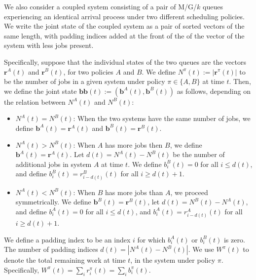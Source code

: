 \documentclass[acmsmall]{acmart}
\newcommand{\rb}{\boldsymbol{r}}
\newcommand{\bb}{\boldsymbol{b}}
\newcommand{\bbb}{\bb\bb}
\begin{document}
We also consider a coupled system consisting of a pair of M/G/$k$ queues experiencing an identical arrival process under two different scheduling policies.
We write the joint state of the coupled system as a pair of sorted vectors of the same length,
with padding indices added at the front of the of the vector of the system with less jobs present. 

Specifically, suppose that the individual states of the two queues are the vectors $\rb^A(t)$
and $\rb^B(t)$, for two policies $A$ and $B$.
We define $N^\pi(t) := |\rb^\pi(t)|$ to be the number of jobs in a given system under policy $\pi\in\{A,B\}$ at time $t$. Then, we define the joint state $\bbb(t):=(\bb^A(t),\bb^B(t))$ as follows, depending on the relation between $N^A(t)$ and $N^B(t)$:

\begin{itemize}
    \item $N^A(t) = N^B(t)$: When the two systems have the same number of jobs, we define $\bb^A(t) = \rb^A(t)$ and $\bb^B(t) = \rb^B(t)$.
    \item $N^A(t) > N^B(t)$: When $A$ has more jobs then $B$, we define $\bb^A(t) = \rb^A(t)$. Let $d(t) = N^A(t) - N^B(t)$ be the number of additional jobs in system $A$ at time $t$.
    We define $b^B_i(t) = 0$ for all $i \le d(t)$, and define $b^B_i(t) = r^B_{i-d(t)}(t)$ for all $i \ge d(t)+1$.
    \item $N^A(t) < N^B(t)$: When $B$ has more jobs than $A$, we proceed symmetrically. We define $\bb^B(t) = \rb^B(t)$,
    let $d(t) = N^B(t) - N^A(t)$, and define $b^A_i(t) = 0$ for all $i \le d(t)$, and $b^A_i(t) = r^A_{i-d(t)}(t)$ for all $i \ge d(t)+1$.
\end{itemize}

We define a padding index to be an index $i$ for which $b^A_i(t)$ or $b^B_i(t)$ is zero. The number of padding indices $d(t)=|N^A(t) - N^B(t)|$. We use $W^\pi(t)$ to denote the total remaining work at time $t$, in the system under policy $\pi$. Specifically, $W^\pi(t) = \sum_i r_i^\pi(t)=\sum_i b_i^\pi(t)$.
\end{document}
